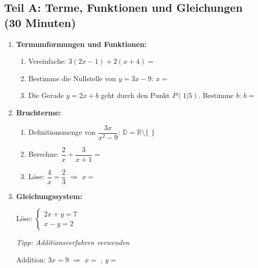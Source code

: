 \subsection*{Teil A: Terme, Funktionen und Gleichungen (30 Minuten)}

\begin{enumerate}[label=\arabic*.]

    \item \textbf{Termumformungen und Funktionen:}
    \vspace{0.5cm}

    \begin{enumerate}[label=\alph*)]
        \item Vereinfache: $3(2x - 1) + 2(x + 4) =$ \underline{\hspace{4cm}}
        \vspace{0.3cm}
        \item Bestimme die Nullstelle von $y = 3x - 9$: $x =$ \underline{\hspace{2cm}}
        \vspace{0.3cm}
        \item Die Gerade $y = 2x + b$ geht durch den Punkt $P(1|5)$. Bestimme $b$: $b =$ \underline{\hspace{2cm}}
    \end{enumerate}

    \vspace{1cm}

    \item \textbf{Bruchterme:}
    \vspace{0.5cm}

    \begin{enumerate}[label=\alph*)]
        \item Definitionsmenge von $\dfrac{3x}{x^2-9}$: $\mathbb{D} = \mathbb{R} \setminus \{$ \underline{\hspace{2cm}} $\}$
        \vspace{0.3cm}
        \item Berechne: $\dfrac{2}{x} + \dfrac{3}{x+1} =$ \underline{\hspace{4cm}}
        \vspace{0.3cm}
        \item Löse: $\dfrac{4}{x} = \dfrac{2}{3}$ $\Rightarrow$ $x =$ \underline{\hspace{2cm}}
    \end{enumerate}

    \vspace{1cm}

    \item \textbf{Gleichungssystem:}
    \vspace{0.5cm}

    Löse: $\begin{cases} 2x + y = 7 \\ x - y = 2 \end{cases}$

    \textit{Tipp: Additionsverfahren verwenden}

    Addition: $3x = 9$ $\Rightarrow$ $x =$ \underline{\hspace{1.5cm}}, $y =$ \underline{\hspace{1.5cm}}

\end{enumerate}